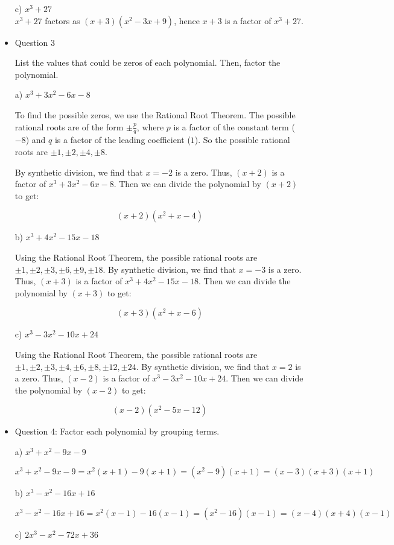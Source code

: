\documentclass{article}
\begin{document}
\begin{itemize}
c) $x^3+27$\\
$x^3 + 27$ factors as $(x + 3)(x^2 - 3x + 9)$, hence $x + 3$ is a factor of $x^3 + 27$.



\item Question 3

List the values that could be zeros of each polynomial. Then, factor the polynomial.

a) $x^3+3x^2-6x-8$

To find the possible zeros, we use the Rational Root Theorem. The possible rational roots are of the form $\pm \frac{p}{q}$, where $p$ is a factor of the constant term ($-8$) and $q$ is a factor of the leading coefficient ($1$). So the possible rational roots are $\pm 1, \pm 2, \pm 4, \pm 8$.

By synthetic division, we find that $x = -2$ is a zero. Thus, $(x + 2)$ is a factor of $x^3+3x^2-6x-8$. Then we can divide the polynomial by $(x + 2)$ to get:

\[
(x + 2)(x^2 + x - 4)
\]

b) $x^3+4x^2-15x-18$

Using the Rational Root Theorem, the possible rational roots are $\pm 1, \pm 2, \pm 3, \pm 6, \pm 9, \pm 18$. By synthetic division, we find that $x = -3$ is a zero. Thus, $(x + 3)$ is a factor of $x^3+4x^2-15x-18$. Then we can divide the polynomial by $(x + 3)$ to get:

\[
(x + 3)(x^2 + x - 6)
\]

c) $x^3-3x^2-10x+24$

Using the Rational Root Theorem, the possible rational roots are $\pm 1, \pm 2, \pm 3, \pm 4, \pm 6, \pm 8, \pm 12, \pm 24$. By synthetic division, we find that $x = 2$ is a zero. Thus, $(x - 2)$ is a factor of $x^3-3x^2-10x+24$. Then we can divide the polynomial by $(x - 2)$ to get:

\[
(x - 2)(x^2 - 5x - 12)
\]

\item Question 4:
Factor each polynomial by grouping terms.

a) $x^3+x^2-9x-9$

\[
x^3 + x^2 - 9x - 9 = x^2(x + 1) - 9(x + 1) = (x^2 - 9)(x + 1) = (x - 3)(x + 3)(x + 1)
\]

b) $x^3 - x^2 - 16x + 16$

\[
x^3 - x^2 - 16x + 16 = x^2(x - 1) - 16(x - 1) = (x^2 - 16)(x - 1) = (x - 4)(x + 4)(x - 1)
\]

c) $2x^3 - x^2 - 72x + 36$


\end{itemize}
\end{document}

